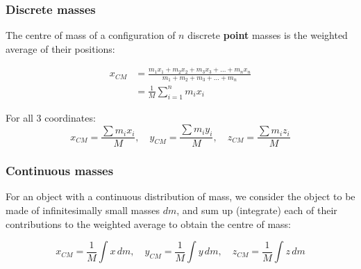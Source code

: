 \documentclass[11pt]{article}
\begin{document}
\subsubsection{Discrete masses}
\label{sec:orgb135043}
The centre of mass of a configuration of \(n\) discrete \textbf{point} masses is the weighted average of their positions:

\begin{align*}
x_{CM} &= \frac{m_1 x_1 + m_2 x_2 + m_3 x_3 + \ldots + m_n x_n}{m_1 + m_2 + m_3 + \ldots + m_n} \\
&= \frac{1}{M} \sum_{i = 1}^n m_i x_i
\end{align*}

For all 3 coordinates:
\[x_{CM} = \frac{\sum m_i x_i}{M}, \quad y_{CM} = \frac{\sum m_i y_i}{M}, \quad z_{CM} = \frac{\sum m_i z_i}{M}\]

\subsubsection{Continuous masses}
\label{sec:orgd665237}
For an object with a continuous distribution of mass, we consider the object to be made of infinitesimally small masses \(dm\), and sum up (integrate) each of their contributions to the weighted average to obtain the centre of mass:

\[x_{CM} = \frac{1}{M} \int x \, dm, \quad y_{CM} = \frac{1}{M} \int y \, dm, \quad z_{CM} = \frac{1}{M} \int z \, dm\]
\end{document}
